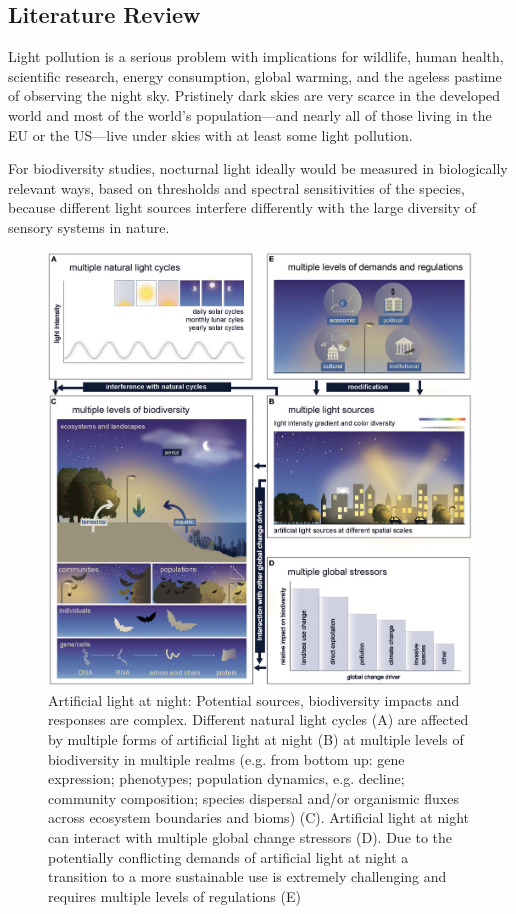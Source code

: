 \subsection{Literature Review}
Light pollution is a serious problem with implications for wildlife, human health, scientific research, energy consumption, global warming, and the ageless pastime of observing the night sky. Pristinely dark skies are very scarce in the developed world and most of the world's population—and nearly all of those living in the EU or the US—live under skies with at least some light pollution\cite{GALLAWAY2010658}. 

For biodiversity studies, nocturnal light ideally would be measured in biologically relevant ways, based on thresholds and spectral sensitivities of the species, because different light sources interfere differently with the large diversity of sensory systems in nature\cite{davies2013artificial}. 

\begin{figure}[H]\centering
    \includegraphics[width=1\textwidth]{figures/fevo-09-767177-g002.jpg}
    \caption{Artificial light at night: Potential sources, biodiversity impacts and responses are complex. Different natural light cycles (A) are affected by multiple forms of artificial light at night (B) at multiple levels of biodiversity in multiple realms (e.g. from bottom up: gene expression; phenotypes; population dynamics, e.g. decline; community composition; species dispersal and/or organismic fluxes across ecosystem boundaries and bioms) (C). Artificial light at night can interact with multiple global change stressors (D). Due to the potentially conflicting demands of artificial light at night a transition to a more sustainable use is extremely challenging and requires multiple levels of regulations (E) \cite{10.3389/fevo.2021.767177}} \label{fig:figure2}
\end{figure}

